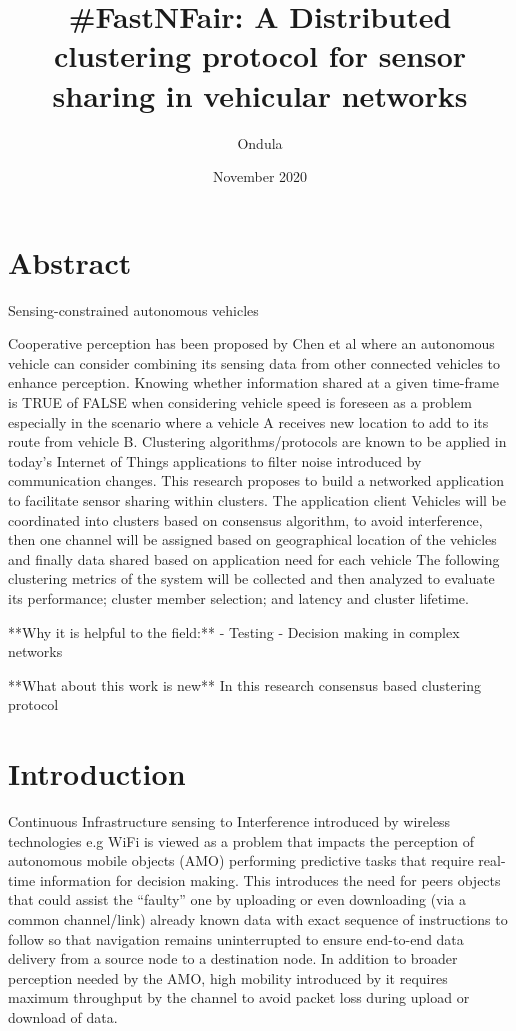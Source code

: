 \documentclass{article}
\title{#FastNFair: A Distributed clustering protocol for sensor sharing in vehicular networks}
\author{Ondula}
\date{November 2020}
\begin{document}
\maketitle

\section{Abstract}
Sensing-constrained autonomous vehicles


Cooperative perception has been proposed by Chen et al where an autonomous vehicle can consider combining its sensing data from other connected vehicles to enhance perception. Knowing whether information shared at a given time-frame is TRUE of FALSE when considering vehicle speed is foreseen as a problem especially in the scenario where a vehicle A receives new location to add to its route from vehicle B. Clustering algorithms/protocols are known to be applied in today's Internet of Things applications to filter noise introduced by communication changes. This research proposes to build a networked application to facilitate sensor sharing within clusters. The application client Vehicles will be coordinated into clusters based on consensus algorithm, to avoid interference, then one channel will be assigned based on geographical location of the vehicles and finally data shared based on application need for each vehicle The following clustering metrics of the system will be collected and then analyzed to evaluate its performance; cluster member selection; and latency and cluster lifetime.

**Why it is helpful to the field:**
- Testing
- Decision making in complex networks

**What about this work is new**
In this research consensus based clustering protocol


\section{Introduction}


Continuous Infrastructure sensing to Interference introduced by wireless technologies e.g  WiFi is viewed as a problem that impacts the perception of autonomous mobile objects (AMO) performing predictive tasks that require real-time information for decision making. This introduces the need for peers objects that could assist the “faulty” one by uploading or even downloading (via a common channel/link) already known data with exact sequence of instructions to follow so that navigation remains uninterrupted to ensure end-to-end data delivery from a source node to a destination node. In addition to broader perception needed by the AMO, high mobility introduced by it requires maximum throughput by the channel to avoid packet loss during upload or download of data.
\end{document}

